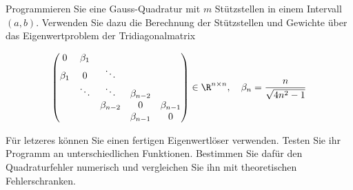 
\begin{exercise}

Programmieren Sie eine Gauss-Quadratur mit $m$ Stützstellen in einem Intervall $(a, b)$.
Verwenden Sie dazu die Berechnung der Stützstellen und Gewichte über das Eigenwertproblem der Tridiagonalmatrix

\begin{align}
  \begin{pmatrix}
    0       & \beta_1 &             &             & \\
    \beta_1 & 0       & \ddots      &             & \\
            & \ddots  & \ddots      & \beta_{n-2} & \\
            &         & \beta_{n-2} & 0           & \beta_{n-1} \\
            &         &             & \beta_{n-1} & 0
  \end{pmatrix}
  \in
  \R^{n \times n},
  \quad
  \beta_n = \frac{n}{\sqrt{4n^2 -1}}
\end{align}

Für letzeres können Sie einen fertigen Eigenwertlöser verwenden.
Testen Sie ihr Programm an unterschiedlichen Funktionen.
Bestimmen Sie dafür den Quadraturfehler numerisch und vergleichen Sie ihn mit theoretischen Fehlerschranken.

\end{exercise}


